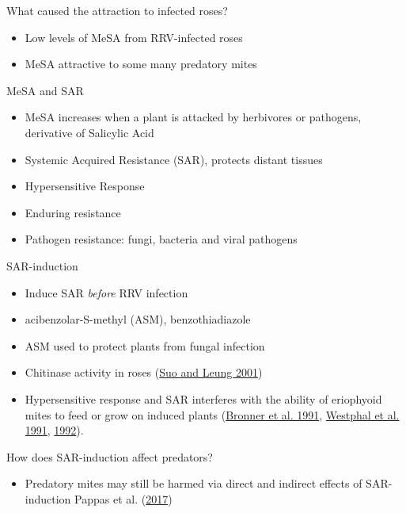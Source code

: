 \documentclass[
  ignorenonframetext,
]{beamer}
\providecommand{\tightlist}{%
  \setlength{\itemsep}{0pt}\setlength{\parskip}{0pt}}
\begin{document}
\begin{frame}
\begin{block}{What caused the attraction to infected roses?}
\protect\hypertarget{what-caused-the-attraction-to-infected-roses}{}
\begin{itemize}
\tightlist
\item
  Low levels of MeSA from RRV-infected roses
\item
  MeSA attractive to some many predatory mites
\end{itemize}
\end{block}

\begin{block}{MeSA and SAR}
\protect\hypertarget{mesa-and-sar}{}
\begin{itemize}
\tightlist
\item
  MeSA increases when a plant is attacked by herbivores or pathogens,
  derivative of Salicylic Acid
\item
  Systemic Acquired Resistance (SAR), protects distant tissues
\item
  Hypersensitive Response
\item
  Enduring resistance
\item
  Pathogen resistance: fungi, bacteria and viral pathogens
\end{itemize}
\end{block}

\begin{block}{SAR-induction}
\protect\hypertarget{sar-induction}{}
\begin{itemize}
\tightlist
\item
  Induce SAR \emph{before} RRV infection
\item
  acibenzolar-S-methyl (ASM), benzothiadiazole
\item
  ASM used to protect plants from fungal infection
\item
  Chitinase activity in roses (\protect\hyperlink{ref-Suo2001}{Suo and
  Leung 2001})
\item
  Hypersensitive response and SAR interferes with the ability of
  eriophyoid mites to feed or grow on induced plants
  (\protect\hyperlink{ref-Bronner1991a}{Bronner et al. 1991},
  \protect\hyperlink{ref-Westphal1991}{Westphal et al. 1991},
  \protect\hyperlink{ref-Westphal1992}{1992}).
\end{itemize}
\end{block}

\begin{block}{How does SAR-induction affect predators?}
\protect\hypertarget{how-does-sar-induction-affect-predators}{}
\begin{itemize}
\tightlist
\item
  Predatory mites may still be harmed via direct and indirect effects of
  SAR-induction Pappas et al. (\protect\hyperlink{ref-Pappas2017}{2017})
\end{itemize}
\end{block}


\end{frame}
\end{document}
